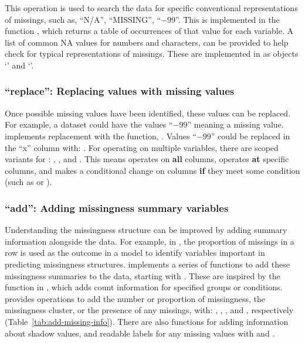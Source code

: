 \documentclass[article]{jss}
\begin{document}
This operation is used to search the data for specific conventional
representations of missings, such as, ``N/A'', ``MISSING'', ``$-99$''.  This
is implemented in the function , which returns a
table of occurrences of that value for each variable.  A list of common NA
values for numbers and characters, can be provided to help check for typical
representations of missings.  These are implemented in  as
objects `' and `'.

\hypertarget{verbs-replace-with}{%
\subsubsection{``replace'': Replacing values with missing values}\label{verbs-replace-with}}

Once possible missing values have been identified, these values can be
replaced.  For example, a dataset could have the values ``$-99$'' meaning a
missing value.   implements replacement with the function,
.  Values ``$-99$'' could be replaced in the ``x''
column with: .  For
operating on multiple variables, there are scoped variants for
: , , and .  This
means  operates on \textbf{all} columns,
 operates \textbf{at} specific columns, and
 makes a conditional change on columns
\textbf{if} they meet some condition (such as  or
).

\hypertarget{verbs-add-cols}{%
\subsubsection{``add'': Adding missingness summary variables}\label{verbs-add-cols}}

Understanding the missingness structure can be improved by adding summary
information alongside the data.  For example, in \citep{Tierney2015}, the
proportion of missings in a row is used as the outcome in a model to
identify variables important in predicting missingness structures.
 implements a series of functions to add these missingness
summaries to the data, starting with .  These are inspired by the
 function in , which adds count information for
specified groups or conditions.   provides operations to add the
number or proportion of missingness, the missingness cluster, or the
presence of any missings, with: , ,
, and , respectively
(Table~\ref{tab:add-missing-info}).  There are also functions for adding
information about shadow values, and readable labels for any missing values
with  and .
\end{document}
